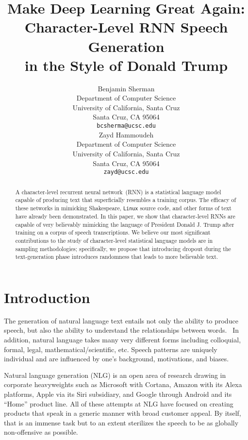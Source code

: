 \documentclass{article}
\title{Make Deep Learning Great Again: \\ Character-Level RNN Speech Generation \\ in the Style of Donald Trump}
\author{
  Benjamin Sherman \\
  Department of Computer Science\\
  University of California, Santa Cruz\\
  Santa Cruz, CA 95064 \\
  \texttt{bcsherma@ucsc.edu} \\
  \And
  Zayd Hammoudeh \\
  Department of Computer Science\\
  University of California, Santa Cruz\\
  Santa Cruz, CA 95064 \\
  \texttt{zayd@ucsc.edu} \\
}
\begin{document}
\maketitle

\begin{abstract}
  A character-level recurrent neural network~(RNN) is a statistical language model capable of producing text that superficially resembles a training corpus. The efficacy of these networks in mimicking Shakespeare, \texttt{Linux} source code, and other forms of text have already been demonstrated. In this paper, we show that character-level RNNs are capable of very believably mimicking the language of President Donald J. Trump after training on a corpus of speech transcriptions. We believe our most significant contributions to the study of character-level statistical language models are in sampling methodologies; specifically, we propose that introducing dropout during the text-generation phase introduces randomness that leads to more believable text.
\end{abstract}

\section{Introduction}

The generation of natural language text entails not only the ability to produce speech, but also the ability to understand the relationships between words.~\cite{mitkov2009}  In addition, natural language takes many very different forms including colloquial, formal, legal, mathematical/scientific, etc.  Speech patterns are uniquely individual and are influenced by one's background, motivations, and biases.  

Natural language generation (NLG) is an open area of research drawing in corporate heavyweights such as Microsoft with Cortana, Amazon with its Alexa platforms, Apple via its Siri subsidiary, and Google through Android and its ``Home'' product line.  All of these attempts at NLG have focused on creating products that speak in a generic manner with broad customer appeal.  By itself, that is an immense task but to an extent sterilizes the speech to be as globally non-offensive as possible.
\end{document}
